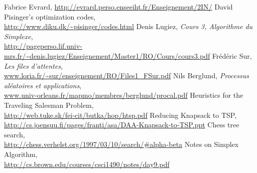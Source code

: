   Fabrice Evrard, \url{http://evrard.perso.enseeiht.fr/Enseignement/2IN/}
  David Pisinger's optimization codes,\\
  \url{http://www.diku.dk/~pisinger/codes.html}
  Denis Lugiez, \emph{Cours 3, Algorithme du Simplexe},\\
  \url{http://pageperso.lif.univ-mrs.fr/~denis.lugiez/Enseignement/Master1/RO/Cours/cours3.pdf}
  Frédéric Sur, \emph{Les files d'attentes}, \\
  \url{www.loria.fr/~sur/enseignement/RO/Files1_FSur.pdf}
  Nils Berglund, \emph{Processus aléatoires et applications}, \\
  \url{www.univ-orleans.fr/mapmo/membres/berglund/procal.pdf}
   Heuristics for the Traveling Salesman Problem,\\
   \url{http://web.tuke.sk/fei-cit/butka/hop/htsp.pdf}
   Reducing Knapsack to TSP,\\
   \url{http://cs.joensuu.fi/pages/franti/asa/DAA-Knapsack-to-TSP.ppt}
   Chess tree search, \\
   \url{http://chess.verhelst.org/1997/03/10/search/#alpha-beta}
  Notes on Simplex Algorithm, \\
  \url{http://cs.brown.edu/courses/csci1490/notes/day9.pdf}

